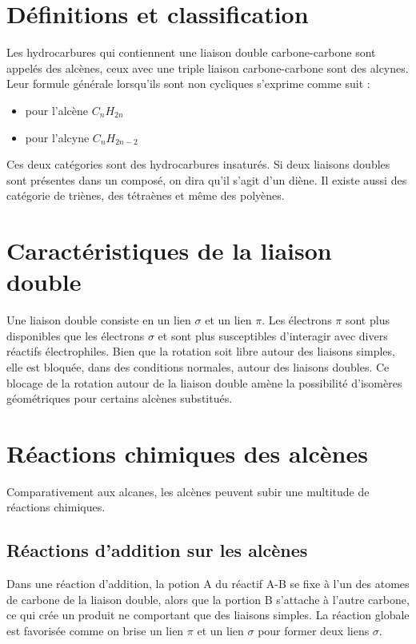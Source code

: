 \section{Définitions et classification}

Les hydrocarbures qui contiennent une liaison double carbone-carbone sont appelés des alcènes, ceux avec une triple liaison carbone-carbone sont des alcynes.
Leur formule générale lorsqu'ils sont non cycliques s'exprime comme suit :
\begin{itemize}
  \item pour l'alcène $C_nH_{2n}$
  \item pour l'alcyne $C_nH_{2n-2}$
\end{itemize}
Ces deux catégories sont des hydrocarbures insaturés.
Si deux liaisons doubles sont présentes dans un composé, on dira qu'il s'agit d'un diène.
Il existe aussi des catégorie de triènes, des tétraènes et même des polyènes.


\section{Caractéristiques de la liaison double}

Une liaison double consiste en un lien $\sigma$ et un lien $\pi$.
Les électrons $\pi$ sont plus disponibles que les électrons $\sigma$ et sont plus susceptibles d'interagir avec divers réactifs électrophiles.
Bien que la rotation soit libre autour des liaisons simples, elle est bloquée, dans des conditions normales, autour des liaisons doubles.
Ce blocage de la rotation autour de la liaison double amène la possibilité d'isomères géométriques pour certains alcènes substitués.


\section{Réactions chimiques des alcènes }
Comparativement aux alcanes, les alcènes peuvent subir une multitude de réactions chimiques.

\subsection{Réactions d'addition sur les alcènes}
Dans une réaction d'addition, la potion A du réactif A-B se fixe à l'un des atomes de carbone de la liaison double, alors que la portion B s'attache à l'autre carbone, ce qui crée un produit ne comportant que des liaisons simples.
La réaction globale est favorisée comme on brise un lien $\pi$ et un lien $\sigma$ pour former deux liens $\sigma$.

